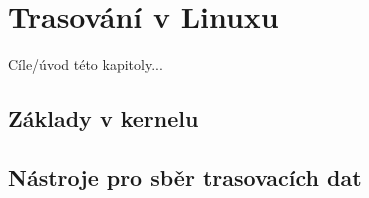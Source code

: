 \chapter{Trasování v Linuxu}

Cíle/úvod této kapitoly...

\section{Základy v kernelu}

\section{Nástroje pro sběr trasovacích dat}